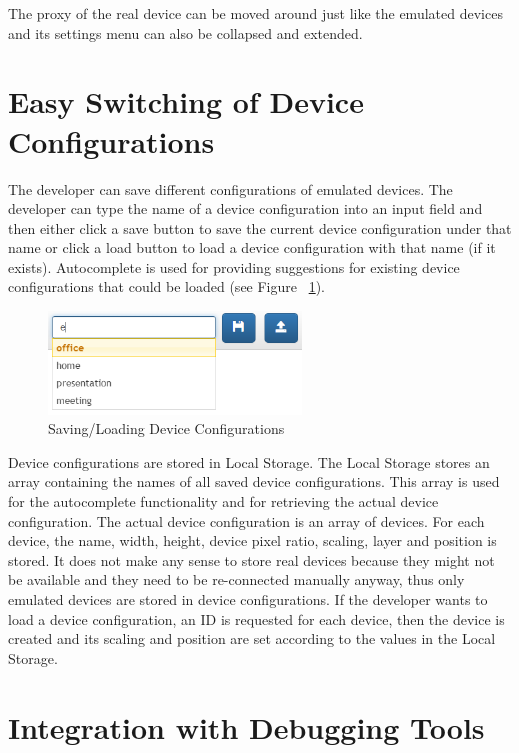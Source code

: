 The proxy of the real device can be moved around just like the emulated devices and its settings menu can also be collapsed and extended.

\section{Easy Switching of Device Configurations}

The developer can save different configurations of emulated devices. The developer can type the name of a device configuration into an input field and then either click a save button to save the current device configuration under that name or click a load button to load a device configuration with that name (if it exists). Autocomplete is used for providing suggestions for existing device configurations that could be loaded (see Figure ~\ref{fig:session_management}). 

\begin{figure}[H]
  \centering
    \includegraphics[width=0.6\textwidth]{images/screenshots/session_management_2.png}
	\caption{Saving/Loading Device Configurations}
	\label{fig:session_management}
\end{figure}

Device configurations are stored in Local Storage. The Local Storage stores an array containing the names of all saved device configurations. This array is used for the autocomplete functionality and for retrieving the actual device configuration. The actual device configuration is an array of devices. For each device, the name, width, height, device pixel ratio, scaling, layer and position is stored. It does not make any sense to store real devices because they might not be available and they need to be re-connected manually anyway, thus only emulated devices are stored in device configurations. If the developer wants to load a device configuration, an ID is requested for each device, then the device is created and its scaling and position are set according to the values in the Local Storage.

\section{Integration with Debugging Tools}

